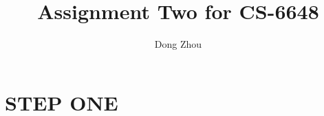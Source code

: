 \documentclass{article}
\author{Dong Zhou}
\title{Assignment Two for CS-6648}
\begin{document}
	\maketitle

	\section{STEP ONE}
\end{document}
